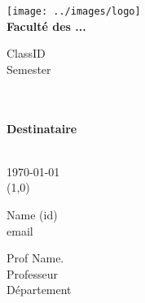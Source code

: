\documentclass[12pt, letterpaper]{article}
\begin{document}
\begingroup
\fontsize{11pt}{12pt}\selectfont

\setlength\parindent{0pt}
\thispagestyle{empty}
\vspace{12mm}
\noindent\begin{minipage}{0.3\textwidth}
\hspace{-0.35cm}\texttt{[image: ../images/logo]}\\
\textbf{Faculté des ...}
\end{minipage}%
\hfill%
\begin{minipage}{0.6\textwidth}\raggedleft
ClassID \\
Semester \\
\end{minipage}
\begin{center}
	\vspace{120pt}
	{\Large {}}\\
	\vspace{20pt}
	{\Large {}} \\
	\vspace{120pt}
    {\Large \textbf{Destinataire}} \\
    \vspace{20pt}
    {\Large {}}
    \\
    \vspace{100pt}
\end{center}
\today
\vspace{10pt}
\\
\line(1,0){\textwidth}\\
\noindent\begin{minipage}{0.5\textwidth}\raggedright
Name (id)\\
email\\
\end{minipage}%
\hfill%
\begin{minipage}{0.5\textwidth}\raggedleft
Prof Name.\\
Professeur \\
Département
\end{minipage}

\endgroup



\newpage

\newpage
\tableofcontents
\newpage


\lipsum



\newpage
\printbibliography
\end{document}
